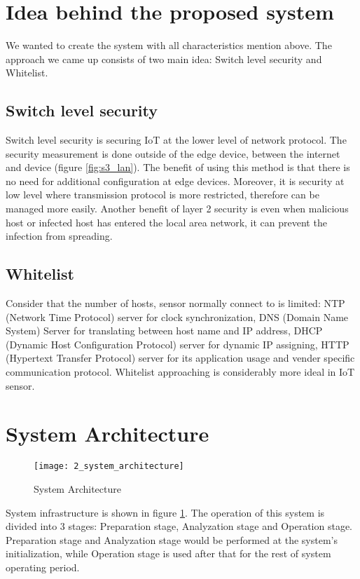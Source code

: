\section{Idea behind the proposed system}
 
We wanted to create the system with all characteristics mention above. The approach we came up consists of two main idea: Switch level security and Whitelist.  

\subsection{Switch level security}
Switch level security is securing IoT at the lower level of network protocol. The security measurement is done outside of the edge device, between the internet and device (figure \ref{fig:s3_lan}).  The benefit of using this method is that there is no need for additional configuration at edge devices. Moreover, it is security at low level where transmission protocol is more restricted, therefore can be managed more easily. Another benefit of layer 2 security is even when malicious host or infected host has entered the local area network, it can prevent the infection from spreading. 

\subsection{Whitelist}
Consider that the number of hosts, sensor normally connect to is limited: NTP (Network Time Protocol) server for clock synchronization, DNS (Domain Name System) Server for translating between host name and IP address, DHCP (Dynamic Host Configuration Protocol) server for dynamic IP assigning, HTTP (Hypertext Transfer Protocol) server for its application usage and vender specific communication protocol. Whitelist approaching is considerably more ideal in IoT sensor.

\section{System Architecture}
\begin{figure}[h]
    \centering 
    \texttt{[image: 2\_system\_architecture]}
    \caption{System Architecture }
    \label{fig:s3_system_architecture} 
\end{figure}

System infrastructure is shown in figure \ref{fig:s3_system_architecture}. The operation of this system is divided into 3 stages: Preparation stage, Analyzation stage and Operation stage. Preparation stage and Analyzation stage would be performed at the system’s initialization, while Operation stage is used after that for the rest of system operating period.  

